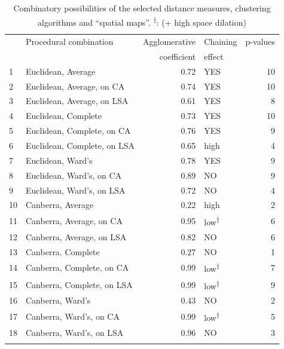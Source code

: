 \begin{table}\caption{Combinatory possibilities of the selected distance measures, clustering algorithms and ``spatial maps''. \textsuperscript{†}: (+ high space dilation)\label{tab:3:13}}
\begin{tabular}{llrlr} 
\lsptoprule
&  Procedural combination &  Agglomerative & {Chaining}  & {p-values}\\
&                         &  coefficient   & {effect} \\\midrule
1 & Euclidean, Average          & 0.72 & YES & 10\\
2 & Euclidean, Average, on CA   & 0.74 & YES & 10\\
3 & Euclidean, Average, on LSA  & 0.61 & YES & 8\\
4 & Euclidean, Complete         & 0.73 & YES & 10\\
5 & Euclidean, Complete, on CA  & 0.76 & YES & 9\\
6 & Euclidean, Complete, on LSA & 0.65 & high & 4\\
7 & Euclidean, Ward’s           & 0.78 & YES & 9\\
8 & Euclidean, Ward’s, on CA    & 0.89 & NO & 9\\
9 & Euclidean, Ward’s, on LSA   & 0.72 & NO & 4\\
10 & Canberra, Average          & 0.22 & high & 2\\
11 & Canberra, Average, on CA   & 0.95 & low\textsuperscript{†}  & 6\\
12 & Canberra, Average, on LSA  & 0.82 & NO & 6\\
13 & Canberra, Complete         & 0.27 & NO & 1\\
14 & Canberra, Complete, on CA  & 0.99 & low\textsuperscript{†} & 7\\
15 & Canberra, Complete, on LSA & 0.99 & low\textsuperscript{†} & 9\\
16 & Canberra, Ward’s           & 0.43 & NO & 2\\
17 & Canberra, Ward’s, on CA    & 0.99 & low\textsuperscript{†} & 5\\
18 & Canberra, Ward’s, on LSA   & 0.96 & NO & 3\\
\lspbottomrule
\end{tabular}
\end{table}

